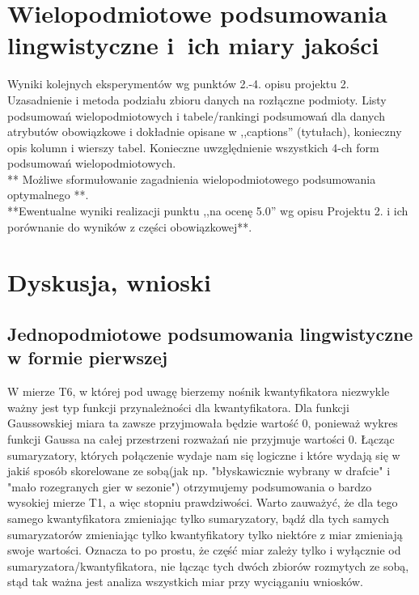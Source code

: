 \documentclass{classrep}
\begin{document}
\section{Wielopodmiotowe podsumowania lingwistyczne i~ich miary jakości} 
Wyniki kolejnych eksperymentów wg punktów 2.-4. opisu projektu 2. Uzasadnienie i
metoda podziału zbioru danych na rozłączne podmioty. Listy podsumowań
wielopodmiotowych i tabele/rankingi podsumowań dla danych atrybutów obowiązkowe i
dokładnie opisane w ,,captions'' (tytułach), konieczny opis kolumn i wierszy tabel.
Konieczne uwzględnienie wszystkich 4-ch form podsumowań wielopodmiotowych. 
\\ 

** Możliwe sformułowanie zagadnienia wielopodmiotowego podsumowania optymalnego **.\\

{**Ewentualne wyniki realizacji punktu ,,na ocenę 5.0'' wg opisu Projektu 2. i ich porównanie do wyników z
części obowiązkowej**.}\\



\section{Dyskusja, wnioski}
\subsection{Jednopodmiotowe podsumowania lingwistyczne w formie pierwszej}

W mierze T6, w której pod uwagę bierzemy nośnik kwantyfikatora niezwykle ważny jest typ funkcji przynależności dla kwantyfikatora. Dla funkcji Gaussowskiej miara ta zawsze przyjmowała będzie wartość 0, ponieważ wykres funkcji Gaussa na całej przestrzeni rozważań nie przyjmuje wartości 0. Łącząc sumaryzatory, których połączenie wydaje nam się logiczne i które wydają się w jakiś sposób skorelowane ze sobą(jak np. "błyskawicznie wybrany w drafcie" i "mało rozegranych gier w sezonie") otrzymujemy podsumowania o bardzo wysokiej mierze T1, a więc stopniu prawdziwości. Warto zauważyć, że dla tego samego kwantyfikatora zmieniając tylko sumaryzatory, bądź dla tych samych sumaryzatorów zmieniając tylko kwantyfikatory tylko niektóre z miar zmieniają swoje wartości. Oznacza to po prostu, że część miar zależy tylko i wyłącznie od sumaryzatora/kwantyfikatora, nie łącząc tych dwóch zbiorów rozmytych ze sobą, stąd tak ważna jest analiza wszystkich miar przy wyciąganiu wniosków.
\end{document}
